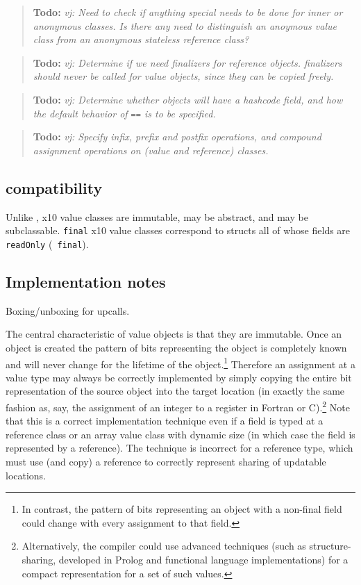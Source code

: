 \documentclass{article}
\def\ccfont{\sf}
\def\x10{{\ccfont x10}}
\newcommand \todo[1] {\begin{quotation}{\bf Todo:} {\footnotesize\em #1}\end{quotation}}
\begin{document}
\todo{vj: Need to check if anything special needs to be done for inner
or anonymous classes.  Is there any need to distinguish an anoymous
value class from an anonymous stateless reference class?  
}
\todo{vj: Determine if we need finalizers for reference
objects. finalizers should never be called for value objects, since
they can be copied freely.}

\todo{vj: Determine whether objects will have a hashcode field, and
how the default behavior of {\tt ==} is to be specified.}

\todo{vj: Specify infix, prefix and postfix operations, and compound assignment operations on (value {\em and} reference) classes.}

\subsection{\csharp{} compatibility}

Unlike \csharp{}, \x10{} value classes are immutable, may be abstract,
and may be subclassable. {\tt final} \x10{} value classes correspond
to \csharp{} structs all of whose fields are {\tt readOnly} ({\tt
final}).


\subsection{Implementation notes}
Boxing/unboxing for upcalls. 

The central characteristic of value objects is that they are 
immutable. Once an object is created the pattern of bits representing
the object is completely known and will never change for the lifetime
of the object.\footnote{In contrast, the pattern of bits representing
an object with a non-final field could change with every assignment to
that field.} Therefore an assignment at a value type may always be
correctly implemented by simply copying the entire bit representation
of the source object into the target location (in exactly the same
fashion as, say, the assignment of an integer to a register in {\sc
Fortran} or {\sc C}).\footnote{Alternatively, the compiler could use
advanced techniques (such as structure-sharing, developed in {\sc
Prolog} and functional language implementations) for a compact
representation for a set of such values.}  Note that this is a correct
implementation technique even if a field is typed at a reference class
or an array value class with dynamic size (in which case the field is
represented by a reference). The technique is incorrect for a
reference type, which must use (and copy) a reference to correctly
represent sharing of updatable locations.
\end{document}

